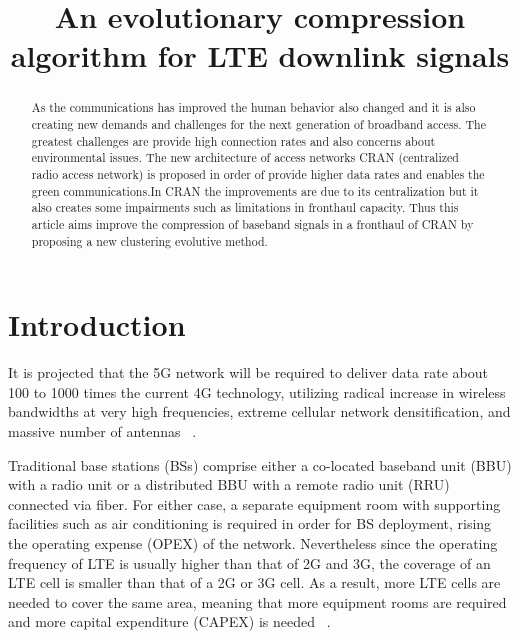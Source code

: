 \documentclass[conference,compsoc]{IEEEtran}
\begin{document}
\title{An evolutionary compression algorithm for LTE  downlink signals }
\author{
}
\IEEEpeerreviewmaketitle
\maketitle

\begin{abstract}
  As the communications has improved the human behavior also changed and it is also 
  creating  new demands and challenges for the next generation of broadband access. The greatest  
  challenges are provide high connection rates and also  concerns  about environmental  
issues. The new architecture of access networks CRAN (centralized radio access network) is 
proposed in order of provide higher data rates and enables the green communications.In CRAN the 
improvements are  due to its centralization but it also creates some impairments such as limitations 
in fronthaul capacity. Thus this article aims improve the compression of baseband signals in a 
fronthaul of CRAN by proposing a new clustering evolutive  method.
\end{abstract}


\section{Introduction}
   
   
  It is projected that the 5G network will be required to deliver data rate about 100 to 1000 
  times the current 4G technology, utilizing radical increase in wireless bandwidths at very 
  high frequencies, extreme cellular network densitification, and massive number of 
  antennas ~\cite{oquesera}.


   Traditional base stations (BSs) comprise either a co-located
   baseband unit (BBU) with a radio unit or a distributed BBU with a remote radio unit  
   (RRU) connected via fiber. For either case, a separate equipment room with supporting facilities 
   such as air conditioning  is required in order for BS deployment, rising the operating expense 
   (OPEX) of the network. Nevertheless since the operating frequency of LTE is    usually higher 
   than that of 2G and 3G, the coverage of an LTE cell is smaller than that of a 2G or 3G cell. As 
   a result, more LTE cells are needed to cover the same area, meaning that more equipment rooms 
   are required and more capital expenditure (CAPEX) is   needed ~\cite{quek2017cloud}.
 
\end{document}
